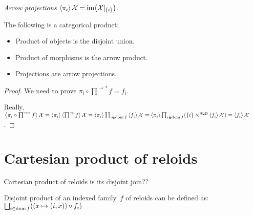 
\begin{defn}
\emph{Arrow projections}
$\left\langle \pi_i\right\rangle\mathcal{X} = \operatorname{im}\bigl(\mathcal{X}|_{\{i\}}\bigr)$.
\end{defn}

\begin{thm}
The following is a categorical product:
\begin{itemize}
\item Product of objects is the disjoint union.
\item Product of morphisms is the arrow product.
\item Projections are arrow projections.
\end{itemize}
\end{thm}

\begin{proof}
We need to prove $\pi_i\circ\prod^{\rightarrow\ast}f=f_i$.

Really, $\left\langle \pi_i\circ\prod^{\rightarrow\ast}f\right\rangle\mathcal{X}=\left\langle \pi_i\right\rangle\left\langle \prod^{\rightarrow}f\right\rangle\mathcal{X}=\left\langle \pi_i\right\rangle\coprod_{i\in\operatorname{dom} f}\left\langle f_i\right\rangle\mathcal{X}=\left\langle \pi_i\right\rangle\prod_{i\in\operatorname{dom} f}(\{i\}\times^{\mathsf{RLD}}\left\langle f_i\right\rangle\mathcal{X})=\left\langle f_i\right\rangle\mathcal{X}$.
\end{proof}

\section{Cartesian product of reloids}

Cartesian product of reloids is its disjoint join??

Disjoint product of an indexed family~$f$ of reloids can be defined as:
$\bigsqcup_{i\in\dom f}((x\mapsto(i,x))\circ f_i)$
